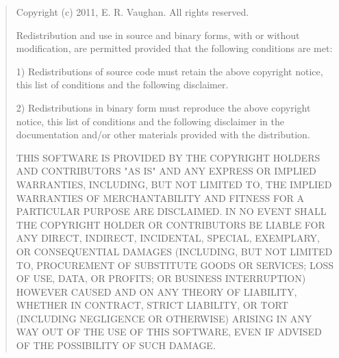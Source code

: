 \documentclass{article}
\begin{document}
\begin{quote}
Copyright (c) 2011, E. R. Vaughan. All rights reserved.

Redistribution and use in source and binary forms, with or without modification,
are permitted provided that the following conditions are met:

1) Redistributions of source code must retain the above copyright notice, this
list of conditions and the following disclaimer.

2) Redistributions in binary form must reproduce the above copyright notice,
this list of conditions and the following disclaimer in the documentation and/or
other materials provided with the distribution.

THIS SOFTWARE IS PROVIDED BY THE COPYRIGHT HOLDERS AND CONTRIBUTORS "AS IS" AND
ANY EXPRESS OR IMPLIED WARRANTIES, INCLUDING, BUT NOT LIMITED TO, THE IMPLIED
WARRANTIES OF MERCHANTABILITY AND FITNESS FOR A PARTICULAR PURPOSE ARE
DISCLAIMED. IN NO EVENT SHALL THE COPYRIGHT HOLDER OR CONTRIBUTORS BE LIABLE FOR
ANY DIRECT, INDIRECT, INCIDENTAL, SPECIAL, EXEMPLARY, OR CONSEQUENTIAL DAMAGES
(INCLUDING, BUT NOT LIMITED TO, PROCUREMENT OF SUBSTITUTE GOODS OR SERVICES;
LOSS OF USE, DATA, OR PROFITS; OR BUSINESS INTERRUPTION) HOWEVER CAUSED AND ON
ANY THEORY OF LIABILITY, WHETHER IN CONTRACT, STRICT LIABILITY, OR TORT
(INCLUDING NEGLIGENCE OR OTHERWISE) ARISING IN ANY WAY OUT OF THE USE OF THIS
SOFTWARE, EVEN IF ADVISED OF THE POSSIBILITY OF SUCH DAMAGE.
\end{quote}

\newpage
\end{document}
